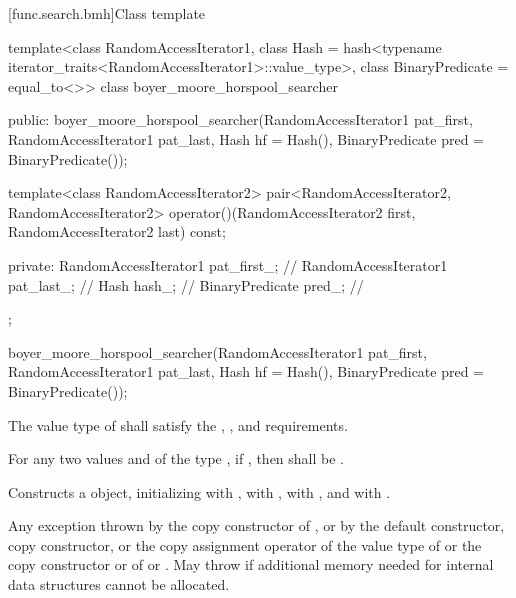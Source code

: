 [func.search.bmh]{Class template }

%
\begin{codeblock}
template<class RandomAccessIterator1,
         class Hash = hash<typename iterator_traits<RandomAccessIterator1>::value_type>,
         class BinaryPredicate = equal_to<>>
  class boyer_moore_horspool_searcher {
  public:
    boyer_moore_horspool_searcher(RandomAccessIterator1 pat_first,
                                  RandomAccessIterator1 pat_last,
                                  Hash hf = Hash(),
                                  BinaryPredicate pred = BinaryPredicate());

    template<class RandomAccessIterator2>
      pair<RandomAccessIterator2, RandomAccessIterator2>
        operator()(RandomAccessIterator2 first, RandomAccessIterator2 last) const;

  private:
    RandomAccessIterator1 pat_first_;   // \expos
    RandomAccessIterator1 pat_last_;    // \expos
    Hash hash_;                         // \expos
    BinaryPredicate pred_;              // \expos
  };
\end{codeblock}

%
\begin{itemdecl}
boyer_moore_horspool_searcher(RandomAccessIterator1 pat_first,
                              RandomAccessIterator1 pat_last,
                              Hash hf = Hash(),
                              BinaryPredicate pred = BinaryPredicate());
\end{itemdecl}

\begin{itemdescr}
\pnum
\requires
The value type of  shall satisfy the ,
, and  requirements.

\pnum
\requires
For any two values  and  of the type ,
if , then  shall be .

\pnum
\effects
Constructs a  object, initializing  with ,
 with ,  with , and  with .

\pnum
\throws
Any exception thrown by the copy constructor of ,
or by the default constructor, copy constructor, or the copy assignment operator of the value type of 
or the copy constructor or  of  or .
May throw  if additional memory needed for internal data structures cannot be allocated.
\end{itemdescr}

